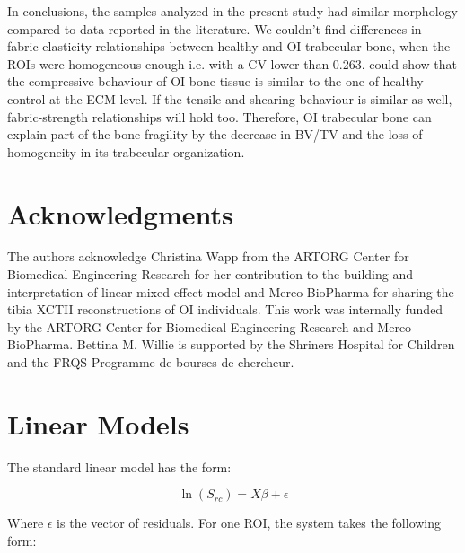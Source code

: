 \documentclass[a4paper,fleqn]{DC_ArtStyle}
\begin{document}
In conclusions, the samples analyzed in the present study had similar morphology compared to data reported in the literature. We couldn't find differences in fabric-elasticity relationships between healthy and OI trabecular bone, when the ROIs were homogeneous enough i.e. with a CV lower than 0.263. \citeauthor{Indermaur2021}\cite{Indermaur2021} could show that the compressive behaviour of OI bone tissue is similar to the one of healthy control at the ECM level. If the tensile and shearing behaviour is similar as well, fabric-strength relationships will hold too. Therefore, OI trabecular bone can explain part of the bone fragility by the decrease in BV/TV and the loss of homogeneity in its trabecular organization.

\section*{Acknowledgments}
The authors acknowledge Christina Wapp from the ARTORG Center for Biomedical Engineering Research for her contribution to the building and interpretation of linear mixed-effect model and Mereo BioPharma for sharing the tibia XCTII reconstructions of OI individuals. This work was internally funded by the ARTORG Center for Biomedical Engineering Research and Mereo BioPharma.  Bettina M. Willie is supported by the Shriners Hospital for Children and the FRQS Programme de bourses de chercheur. 

\appendix
\section{Linear Models}\label{A1}

The standard linear model has the form:

\begin{equation}
	\ln(S_{rc}) = X \beta + \epsilon
\end{equation}

Where $\epsilon$ is the vector of residuals. For one ROI, the system takes the following form:
\end{document}
